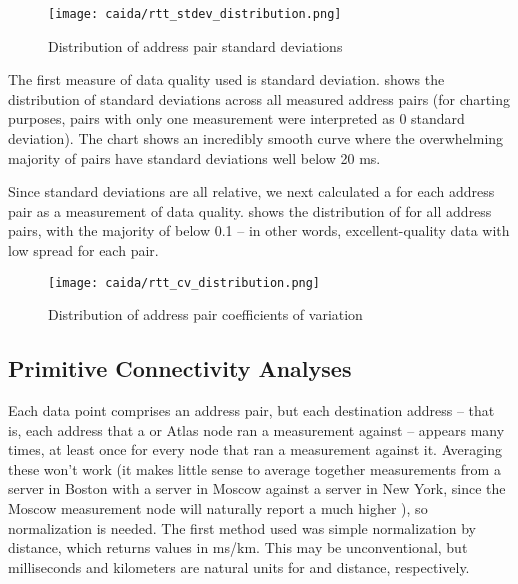 \begin{figure}[htb]
    \centering
    \texttt{[image: caida/rtt\_stdev\_distribution.png]}
    \caption{Distribution of address pair standard deviations}
    \label{fig:caida_stdev_distribution}
\end{figure}

The first measure of data quality used is standard deviation.  shows the distribution of standard deviations across all measured \ip address pairs (for charting purposes, pairs with only one measurement were interpreted as 0 standard deviation). The chart shows an incredibly smooth curve where the overwhelming majority of pairs have standard deviations well below 20 ms.

Since standard deviations are all relative, we next calculated a \cv for each \ip address pair as a measurement of data quality.  shows the distribution of \cvs for all \ip address pairs, with the majority of \cvs below 0.1 -- in other words, excellent-quality data with low spread for each pair.

\begin{figure}[htb]
    \centering
    \texttt{[image: caida/rtt\_cv\_distribution.png]}
    \caption{Distribution of address pair coefficients of variation}
    \label{fig:caida_cv_distribution}
\end{figure}

\subsection{Primitive Connectivity Analyses}

Each data point comprises an \ip address pair, but each destination \ip address -- that is, each \ip address that a \caida or \ripe Atlas node ran a measurement against -- appears many times, at least once for every node that ran a measurement against it. Averaging these won't work (it makes little sense to average together measurements from a server in Boston with a server in Moscow against a server in New York, since the Moscow measurement node will naturally report a much higher \rtt), so normalization is needed. The first method used was simple normalization by distance, which returns values in ms/km. This may be unconventional, but milliseconds and kilometers are natural units for \rtts and distance, respectively.

